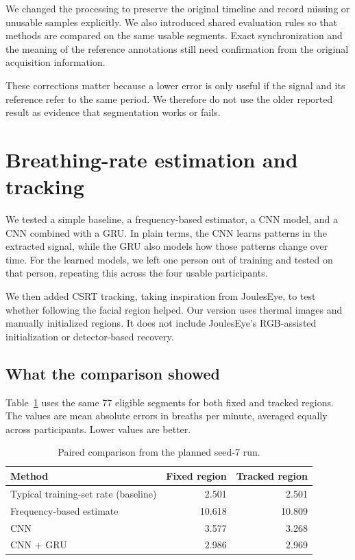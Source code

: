 \documentclass[11pt,a4paper]{article}
\begin{document}
We changed the processing to preserve the original timeline and record missing or unusable samples explicitly. We also introduced shared evaluation rules so that methods are compared on the same usable segments. Exact synchronization and the meaning of the reference annotations still need confirmation from the original acquisition information.

These corrections matter because a lower error is only useful if the signal and its reference refer to the same period. We therefore do not use the older reported result as evidence that segmentation works or fails.

\section{Breathing-rate estimation and tracking}
We tested a simple baseline, a frequency-based estimator, a CNN model, and a CNN combined with a GRU. In plain terms, the CNN learns patterns in the extracted signal, while the GRU also models how those patterns change over time. For the learned models, we left one person out of training and tested on that person, repeating this across the four usable participants.

We then added CSRT tracking, taking inspiration from JoulesEye, to test whether following the facial region helped. Our version uses thermal images and manually initialized regions. It does not include JoulesEye's RGB-assisted initialization or detector-based recovery.

\subsection*{What the comparison showed}
Table~\ref{tab:tracking} uses the same 77 eligible segments for both fixed and tracked regions. The values are mean absolute errors in breaths per minute, averaged equally across participants. Lower values are better.

\begin{table}[htbp]
\centering
\small
\begin{tabularx}{\linewidth}{@{}Xrr@{}}
\toprule
Method & Fixed region & Tracked region\\
\midrule
Typical training-set rate (baseline) & 2.501 & 2.501\\
Frequency-based estimate & 10.618 & 10.809\\
CNN & 3.577 & 3.268\\
CNN + GRU & 2.986 & 2.969\\
\bottomrule
\end{tabularx}
\caption{Paired comparison from the planned seed-7 run.}
\label{tab:tracking}
\end{table}
\end{document}
